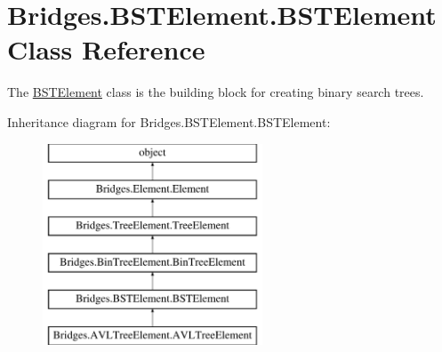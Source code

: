 \hypertarget{class_bridges_1_1_b_s_t_element_1_1_b_s_t_element}{}\section{Bridges.\+B\+S\+T\+Element.\+B\+S\+T\+Element Class Reference}
\label{class_bridges_1_1_b_s_t_element_1_1_b_s_t_element}


The \hyperlink{class_bridges_1_1_b_s_t_element_1_1_b_s_t_element}{B\+S\+T\+Element} class is the building block for creating binary search trees.  


Inheritance diagram for Bridges.\+B\+S\+T\+Element.\+B\+S\+T\+Element\+:\begin{figure}[H]
\begin{center}
\leavevmode
\includegraphics[height=6.000000cm]{class_bridges_1_1_b_s_t_element_1_1_b_s_t_element}
\end{center}
\end{figure}
